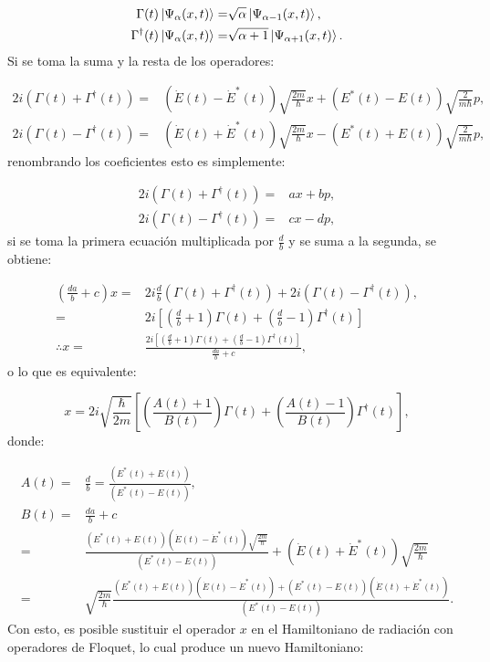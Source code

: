 \documentclass[a4paper,10pt]{report}
\begin{document}
\begin{align*}
\Gamma(t) \Ket{\Psi_\alpha (x,t)} =& \sqrt{\alpha}\Ket{\Psi_{\alpha-1} (x,t)}, \\
\Gamma^\dagger(t) \Ket{\Psi_\alpha (x,t)} =& \sqrt{\alpha+1}\Ket{\Psi_{\alpha+1} (x,t)}.
\end{align*}Si se toma la suma y la resta de los operadores:

\begin{align*}
2i(\Gamma (t) + \Gamma ^\dagger (t)) =& (\dot{E} (t) - \dot{E}^* (t)) \sqrt{\frac{2m}{\hbar}}x + (E^* (t) - E (t))\sqrt{\frac{2}{m\hbar}} p, \\
2i(\Gamma (t) - \Gamma ^\dagger (t)) =& (\dot{E} (t) + \dot{E}^* (t)) \sqrt{\frac{2m}{\hbar}}x -(E^* (t) + E (t))\sqrt{\frac{2}{m\hbar}} p,
\end{align*} renombrando los coeficientes esto es simplemente:

\begin{align*}
2i(\Gamma (t) + \Gamma ^\dagger (t)) =& ax + bp, \\
2i(\Gamma (t) - \Gamma ^\dagger (t)) =& cx - dp,
\end{align*} si se toma la primera ecuación multiplicada por $\frac{d}{b}$ y se suma a la segunda, se obtiene:

\begin{align*}
(\frac{da}{b}+c)x =& 2i \frac{d}{b}(\Gamma (t) + \Gamma ^\dagger (t)) + 2i(\Gamma (t) - \Gamma ^\dagger (t)), \\
=&2i[(\frac{d}{b}+1)\Gamma (t)+(\frac{d}{b}-1)\Gamma^\dagger (t)]\\
\therefore x =& \frac{2i[(\frac{d}{b}+1)\Gamma (t)+(\frac{d}{b}-1)\Gamma^\dagger (t)]}{\frac{da}{b}+c},
\end{align*} o lo que es equivalente:

\begin{equation}
x = 2i \sqrt{\frac{\hbar}{2m}}[(\frac{A(t) +1}{B(t)})\Gamma (t) +(\frac{A(t) -1}{B(t)})\Gamma^\dagger (t)],
\end{equation} donde:

\begin{align}
A(t) =& \frac{d}{b} = \frac{(E^* (t) + E (t))}{(E^* (t) - E (t))}, \\
B(t) = & \frac{da}{b}+c \\
=& \frac{(E^* (t) + E (t))(\dot{E} (t) - \dot{E}^* (t)) \sqrt{\frac{2m}{\hbar}}}{(E^* (t) - E (t))} + (\dot{E} (t) + \dot{E}^* (t)) \sqrt{\frac{2m}{\hbar}}\\
=&\sqrt{\frac{2m}{\hbar}}\frac{(E^* (t) + E (t))(\dot{E} (t) - \dot{E}^* (t))+(E^* (t) - E (t))(\dot{E} (t) + \dot{E}^* (t))}{(E^* (t) - E (t))}.
\end{align}Con esto, es posible sustituir el operador $x$ en el Hamiltoniano de radiación con operadores de Floquet, lo cual produce un nuevo Hamiltoniano:
\end{document}
